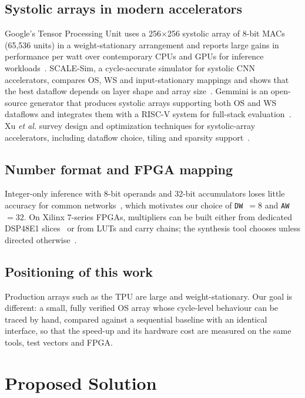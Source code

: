 \documentclass[conference]{IEEEtran}
\newcommand{\code}[1]{\texttt{#1}}
\begin{document}
\subsection{Systolic arrays in modern accelerators}
Google's Tensor Processing Unit uses a 256$\times$256 systolic array of 8-bit
MACs (65,536 units) in a weight-stationary arrangement and reports large gains
in performance per watt over contemporary CPUs and GPUs for inference
workloads~\cite{jouppi2017}. SCALE-Sim, a cycle-accurate simulator for
systolic CNN accelerators, compares OS, WS and input-stationary mappings and
shows that the best dataflow depends on layer shape and array
size~\cite{samajdar2018}. Gemmini is an open-source generator that produces
systolic arrays supporting both OS and WS dataflows and integrates them with a
RISC-V system for full-stack evaluation~\cite{genc2021}. Xu \emph{et al.}
survey design and optimization techniques for systolic-array accelerators,
including dataflow choice, tiling and sparsity support~\cite{xu2023}.

\subsection{Number format and FPGA mapping}
Integer-only inference with 8-bit operands and 32-bit accumulators loses little
accuracy for common networks~\cite{jacob2018}, which motivates our choice of
\code{DW}~$=8$ and \code{AW}~$=32$. On Xilinx 7-series FPGAs, multipliers can
be built either from dedicated DSP48E1 slices~\cite{ug479} or from LUTs and
carry chains; the synthesis tool chooses unless directed
otherwise~\cite{ug901}.

\subsection{Positioning of this work}
Production arrays such as the TPU are large and weight-stationary. Our goal is
different: a small, fully verified OS array whose cycle-level behaviour can be
traced by hand, compared against a sequential baseline with an identical
interface, so that the speed-up and its hardware cost are measured on the same
tools, test vectors and FPGA.

\section{Proposed Solution}\label{sec:prop}
\end{document}
